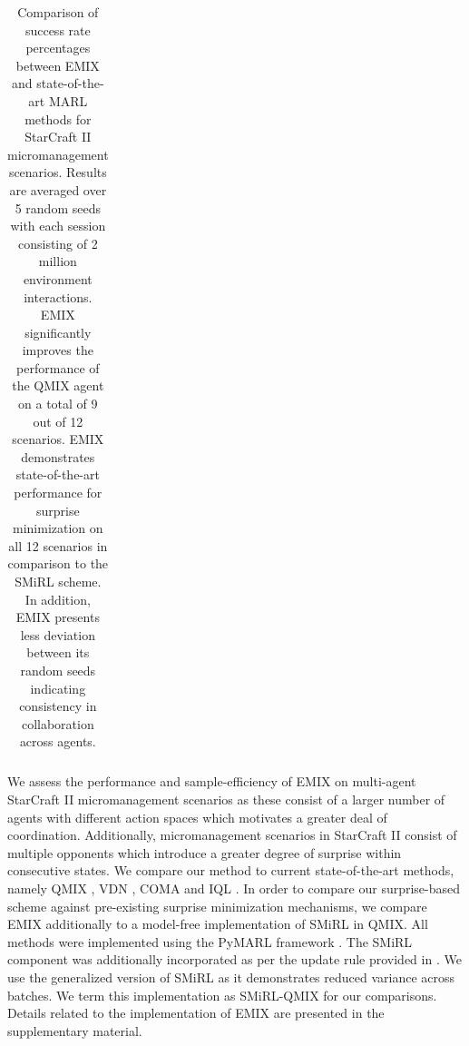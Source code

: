 \documentclass{article}
\begin{document}
\begin{multicols}{2}
\begin{table}[ht]
{\begin{tabular}{c c c c c c c}
 \hline
 \end{tabular}}
 \caption{Comparison of success rate percentages between EMIX and state-of-the-art MARL methods for StarCraft II micromanagement scenarios. Results are averaged over 5 random seeds with each session consisting of 2 million environment interactions. EMIX significantly improves the performance of the QMIX agent on a total of 9 out of 12 scenarios. EMIX demonstrates state-of-the-art performance for surprise minimization on all 12 scenarios in comparison to the SMiRL scheme. In addition, EMIX presents less deviation between its random seeds indicating consistency in collaboration across agents.}
\label{tab:table}
\end{table}
We assess the performance and sample-efficiency of EMIX on multi-agent StarCraft II micromanagement scenarios \cite{smac} as these consist of a larger number of agents with different action spaces which motivates a greater deal of coordination. Additionally, micromanagement scenarios in StarCraft II consist of multiple opponents which introduce a greater degree of surprise within consecutive states. We compare our method to current state-of-the-art methods, namely QMIX \cite{qmix}, VDN \cite{vdn}, COMA \cite{coma} and IQL \cite{iql}. In order to compare our surprise-based scheme against pre-existing surprise minimization mechanisms, we compare EMIX additionally to a model-free implementation of SMiRL \cite{smirl} in QMIX. All methods were implemented using the PyMARL framework \cite{smac}. The SMiRL component was additionally incorporated as per the update rule provided in \cite{gen}. We use the generalized version of SMiRL as it demonstrates reduced variance across batches. We term this implementation as SMiRL-QMIX for our comparisons. Details related to the implementation of EMIX are presented in the supplementary material.


\end{multicols}
\end{document}
